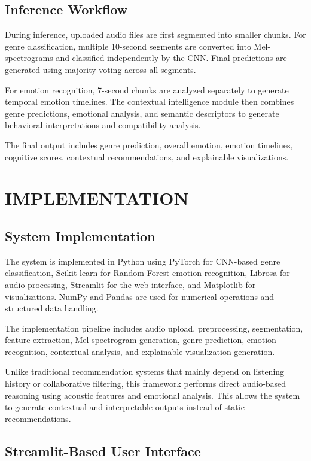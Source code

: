 \documentclass[12pt,a4paper]{report}
\begin{document}
\section{Inference Workflow}

During inference, uploaded audio files are first segmented into smaller chunks. For genre classification, multiple 10-second segments are converted into Mel-spectrograms and classified independently by the CNN. Final predictions are generated using majority voting across all segments.

For emotion recognition, 7-second chunks are analyzed separately to generate temporal emotion timelines. The contextual intelligence module then combines genre predictions, emotional analysis, and semantic descriptors to generate behavioral interpretations and compatibility analysis.

The final output includes genre prediction, overall emotion, emotion timelines, cognitive scores, contextual recommendations, and explainable visualizations.  

\chapter{IMPLEMENTATION}

\section{System Implementation}

The system is implemented in Python using PyTorch for CNN-based genre classification, Scikit-learn for Random Forest emotion recognition, Librosa for audio processing, Streamlit for the web interface, and Matplotlib for visualizations. NumPy and Pandas are used for numerical operations and structured data handling.

The implementation pipeline includes audio upload, preprocessing, segmentation, feature extraction, Mel-spectrogram generation, genre prediction, emotion recognition, contextual analysis, and explainable visualization generation.

Unlike traditional recommendation systems that mainly depend on listening history or collaborative filtering, this framework performs direct audio-based reasoning using acoustic features and emotional analysis. This allows the system to generate contextual and interpretable outputs instead of static recommendations.

\section{Streamlit-Based User Interface}
\end{document}
